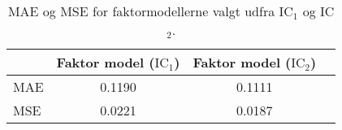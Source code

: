 \begin{table}
\center
\begin{tabular}{lccc}
\toprule
& Faktor model ($\text{IC}_1$) & Faktor model ($\text{IC}_2$)  \\
\midrule 
MAE & 0.1190 & 0.1111 \\ 
MSE &  0.0221  & 0.0187 \\ \bottomrule
 \end{tabular}
\caption{MAE og MSE for faktormodellerne valgt udfra IC\(_1\) og IC\(_2\).} \label{tab:factor_mse_tab}
\end{table}